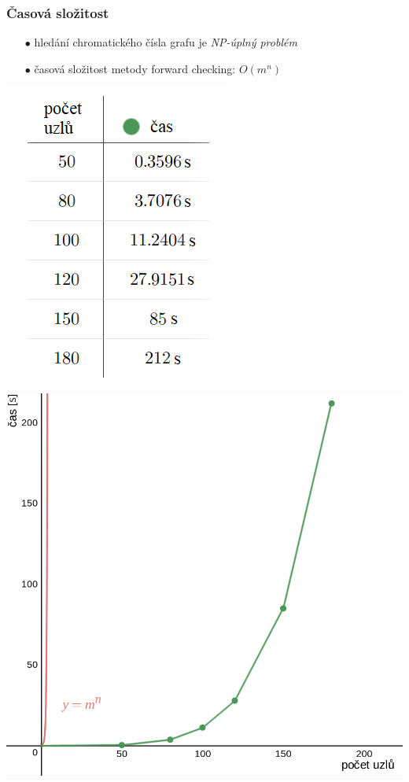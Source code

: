 \documentclass[10pt,xcolor=pdflatex]{beamer}
\begin{document}
\begin{frame}\frametitle{Časová složitost}
	\begin{itemize}
	\item[$\bullet$] hledání chromatického čísla grafu je \emph{NP-úplný problém}
    \item[$\bullet$] časová složitost metody forward checking: \emph{$O(m^n)$}
    \end{itemize}
    \includegraphics[scale=0.3]{img/complex1.png}
    \includegraphics[scale=0.2]{img/complex2.png}
\end{frame}
\end{document}

